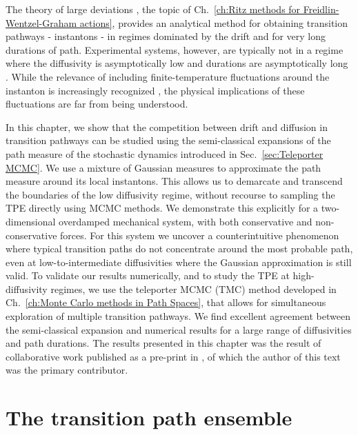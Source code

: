 The theory of large deviations \citep{wentzellSmallRandomPerturbations1970, stratonovichMarkovMethodsTheory1989a, grahamMacroscopicPotentialsBifurcations1989a, arnoldStochasticDifferentialEquations1974a}, the topic of Ch.~\ref{ch:Ritz methods for Freidlin-Wentzel-Graham actions},
provides an analytical method for obtaining transition pathways -
instantons - in regimes dominated by the drift and for very long durations
of path. Experimental systems, however, are typically not in a regime
where the diffusivity is asymptotically low and durations are asymptotically
long \citep{gladrowExperimentalMeasurementRelative2021a}. While the
relevance of including finite-temperature fluctuations around the
instanton \citep{gelfandIntegrationFunctionalSpaces1960a} is increasingly
recognized \citep{nickelsenNoiseCorrectionLarge2022, corazzaNormalizedGaussianPath2020b, luGaussianApproximationsTransition2017a},
the physical implications of these fluctuations are far from being
understood.

In this chapter, we show that the competition between drift and diffusion
in transition pathways can be studied using the semi-classical expansions
of the path measure of the stochastic dynamics introduced in Sec.~\ref{sec:Teleporter MCMC}. We use a mixture of
Gaussian measures to approximate the path measure around its local
instantons. This allows us to demarcate and transcend the boundaries
of the low diffusivity regime, without recourse to sampling the TPE directly using MCMC methods. We demonstrate this explicitly for
a two-dimensional overdamped mechanical system, with both conservative
and non-conservative forces. For this system we uncover a counterintuitive
phenomenon where typical transition paths do not concentrate around
the most probable path, even at low-to-intermediate diffusivities
where the Gaussian approximation is still valid. To validate our results
numerically, and to study the TPE at high-diffusivity regimes, we use the teleporter MCMC (TMC) method developed in Ch.~\ref{ch:Monte Carlo methods in Path Spaces},
that allows for simultaneous exploration of multiple transition pathways. We
find excellent agreement between the semi-classical expansion and
numerical results for a large range of diffusivities and path durations. The results presented in this chapter was the result of collaborative work published as a pre-print in \citep{kikuchiDiffusivityDependenceTransition2022}, of which the author of this text was the primary contributor.

\section{The transition path ensemble}

